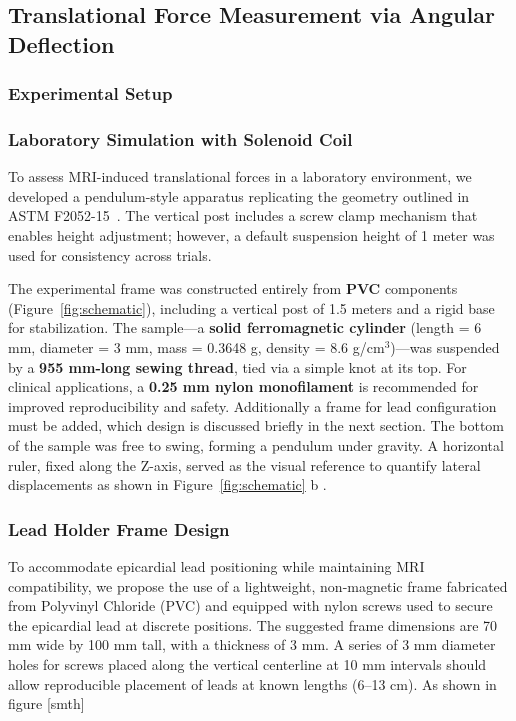 \subsection{Translational Force Measurement via Angular Deflection}

\subsubsection{Experimental Setup}

\subsubsection{Laboratory Simulation with Solenoid Coil}

To assess MRI-induced translational forces in a laboratory environment, we developed a pendulum-style apparatus replicating the geometry outlined in ASTM F2052-15~\cite{astm2052}. The vertical post includes a screw clamp mechanism that enables height adjustment; however, a default suspension height of 1 meter was used for consistency across trials.

The experimental frame was constructed entirely from \textbf{PVC} components (Figure~\ref{fig:schematic}), including a vertical post of 1.5 meters and a rigid base for stabilization. The sample—a \textbf{solid ferromagnetic cylinder} (length = 6 mm, diameter = 3 mm, mass = 0.3648 g, density = 8.6 g/cm$^3$)—was suspended by a \textbf{955 mm-long sewing thread}, tied via a simple knot at its top. For clinical applications, a \textbf{0.25 mm nylon monofilament} is recommended for improved reproducibility and safety. Additionally a frame for lead configuration must be added, which design is discussed briefly in the next section. The bottom of the sample was free to swing, forming a pendulum under gravity. A horizontal ruler, fixed along the Z-axis, served as the visual reference to quantify lateral displacements as shown in Figure~\ref{fig:schematic} b .



\subsubsection*{Lead Holder Frame Design}

To accommodate epicardial lead positioning while maintaining MRI compatibility, we propose the use of a lightweight, non-magnetic frame fabricated from Polyvinyl Chloride (PVC) and equipped with nylon screws used to secure the epicardial lead at discrete positions. The suggested frame dimensions are 70 mm wide by 100 mm tall, with a thickness of 3 mm. A series of 3 mm diameter holes for screws placed along the vertical centerline at 10 mm intervals should allow reproducible placement of leads at known lengths (6–13 cm). As shown in figure [smth]


